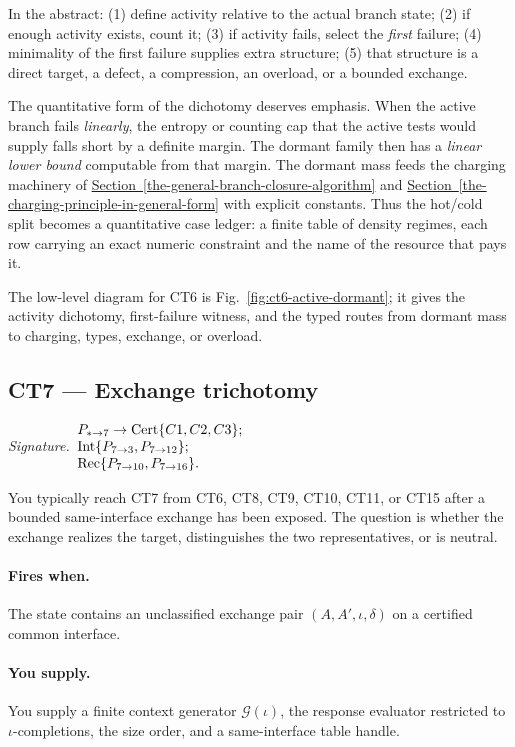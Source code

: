 \documentclass[
  11pt,
]{article}
\theoremstyle{definition}
\newcommand{\secref}[1]{\hyperref[#1]{Section~\ref*{#1}}}
\newcommand{\ctsignature}[1]{\par\noindent\emph{Signature.}\ #1\par\medskip}
\newcommand{\ctcert}[1]{\mathrm{Cert}\{#1\}}
\newcommand{\ctint}[1]{\mathrm{Int}\{#1\}}
\newcommand{\ctrec}[1]{\mathrm{Rec}\{#1\}}
\newcommand{\ctpar}[1]{\paragraph{#1.}}
\begin{document}
In the abstract: (1) define activity relative to the actual branch
state; (2) if enough activity exists, count it; (3) if activity fails,
select the \emph{first} failure; (4) minimality of the first failure
supplies extra structure; (5) that structure is a direct target, a
defect, a compression, an overload, or a bounded exchange.

The quantitative form of the dichotomy deserves emphasis. When the
active branch fails \emph{linearly}, the entropy or counting cap that
the active tests would supply falls short by a definite margin. The
dormant family then has a \emph{linear lower bound} computable from that
margin. The dormant mass feeds the charging machinery of \secref{the-general-branch-closure-algorithm} and
\secref{the-charging-principle-in-general-form} with explicit constants. Thus the hot/cold split becomes a
quantitative case ledger: a finite table of density regimes, each row
carrying an exact numeric constraint and the name of the resource that
pays it.

The low-level diagram for CT6 is Fig.~\ref{fig:ct6-active-dormant};
it gives the activity dichotomy, first-failure witness, and the typed
routes from dormant mass to charging, types, exchange, or overload.



\subsection{CT7 --- Exchange trichotomy}\label{ct:7}\label{the-exchange-trichotomy}
\ctsignature{\(\begin{array}{@{}l@{}}
P_{\ast\to7}\to \ctcert{C1,C2,C3};\\
\ctint{P_{7\to3},P_{7\to12}};\\
\ctrec{P_{7\to10},P_{7\to16}}.
\end{array}\)}

You typically reach CT7 from CT6, CT8, CT9, CT10, CT11, or CT15 after a
bounded same-interface exchange has been exposed.  The question is
whether the exchange realizes the target, distinguishes the two
representatives, or is neutral.

\ctpar{Fires when}
The state contains an unclassified exchange pair
\((A,A',\iota,\delta)\) on a certified common interface.

\ctpar{You supply}
You supply a finite context generator \(\mathcal G(\iota)\), the
response evaluator restricted to \(\iota\)-completions, the size order,
and a same-interface table handle.
\end{document}
